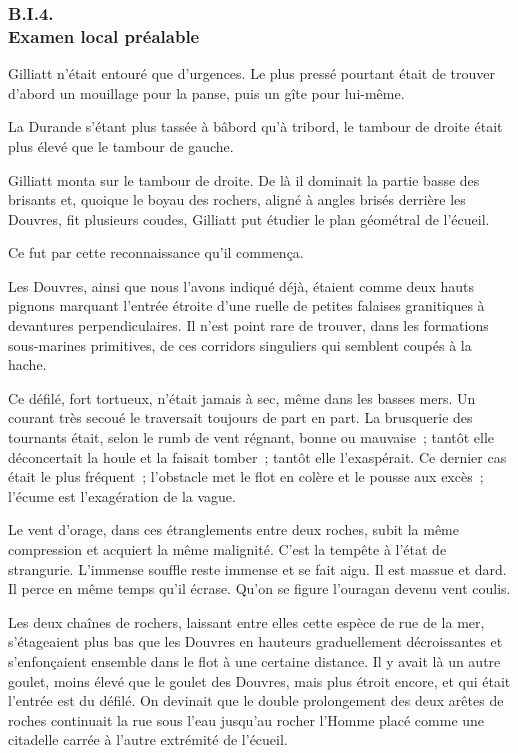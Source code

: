 \documentclass[french,twoside]{book} %
\begin{document}
 \subsubsection[{B.I.4. Examen local préalable}]{B.I.4. \\
Examen local préalable}
\noindent Gilliatt n’était entouré que d’urgences. Le plus pressé pourtant était de trouver d’abord un mouillage pour la panse, puis un gîte pour lui-même.\par
La Durande s’étant plus tassée à bâbord qu’à tribord, le tambour de droite était plus élevé que le tambour de gauche.\par
Gilliatt monta sur le tambour de droite. De là il dominait la partie basse des brisants et, quoique le boyau des rochers, aligné à angles brisés derrière les Douvres, fit plusieurs coudes, Gilliatt put étudier le plan géométral de l’écueil.\par
Ce fut par cette reconnaissance qu’il commença.\par
Les Douvres, ainsi que nous l’avons indiqué déjà, étaient comme deux hauts pignons marquant l’entrée étroite d’une ruelle de petites falaises granitiques à devantures perpendiculaires. Il n’est point rare de trouver, dans les formations sous-marines primitives,  de ces corridors singuliers qui semblent coupés à la hache.\par
Ce défilé, fort tortueux, n’était jamais à sec, même dans les basses mers. Un courant très secoué le traversait toujours de part en part. La brusquerie des tournants était, selon le rumb de vent régnant, bonne ou mauvaise ; tantôt elle déconcertait la houle et la faisait tomber ; tantôt elle l’exaspérait. Ce dernier cas était le plus fréquent ; l’obstacle met le flot en colère et le pousse aux excès ; l’écume est l’exagération de la vague.\par
Le vent d’orage, dans ces étranglements entre deux roches, subit la même compression et acquiert la même malignité. C’est la tempête à l’état de strangurie. L’immense souffle reste immense et se fait aigu. Il est massue et dard. Il perce en même temps qu’il écrase. Qu’on se figure l’ouragan devenu vent coulis.\par
Les deux chaînes de rochers, laissant entre elles cette espèce de rue de la mer, s’étageaient plus bas que les Douvres en hauteurs graduellement décroissantes et s’enfonçaient ensemble dans le flot à une certaine distance. Il y avait là un autre goulet, moins élevé que le goulet des Douvres, mais plus étroit encore, et qui était l’entrée est du défilé. On devinait que le double prolongement des deux arêtes de roches continuait la rue sous l’eau jusqu’au rocher l’Homme placé comme une citadelle carrée à l’autre extrémité de l’écueil.\par
\end{document}
